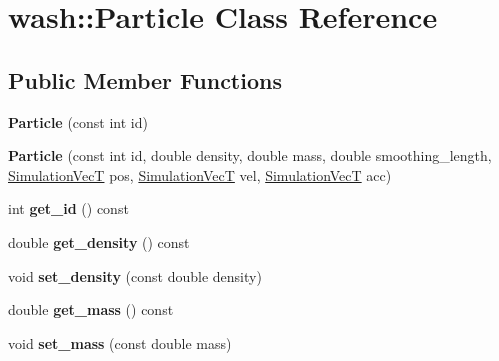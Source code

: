 \hypertarget{classwash_1_1Particle}{}\section{wash\+:\+:Particle Class Reference}
\label{classwash_1_1Particle}
\subsection*{Public Member Functions}
\begin{DoxyCompactItemize}
\item 
\mbox{\label{classwash_1_1Particle_aa7d1ec42cc9e50c64b69b4d1ca60e2bd}} 
{\bfseries Particle} (const int id)
\item 
\mbox{\label{classwash_1_1Particle_ad4372727ee2fd407322e1c3e13f9eae1}} 
{\bfseries Particle} (const int id, double density, double mass, double smoothing\+\_\+length, \mbox{\hyperlink{classwash_1_1Vec}{Simulation\+VecT}} pos, \mbox{\hyperlink{classwash_1_1Vec}{Simulation\+VecT}} vel, \mbox{\hyperlink{classwash_1_1Vec}{Simulation\+VecT}} acc)
\item 
\mbox{\label{classwash_1_1Particle_ad1a609f64405ebeace95a9e7c61f39bb}} 
int {\bfseries get\+\_\+id} () const
\item 
\mbox{\label{classwash_1_1Particle_a8c0ce3f48b189fd8550c3bfab17eec68}} 
double {\bfseries get\+\_\+density} () const
\item 
\mbox{\label{classwash_1_1Particle_a6416678dd509c16c2933d315b6ae6156}} 
void {\bfseries set\+\_\+density} (const double density)
\item 
\mbox{\label{classwash_1_1Particle_a7d8d11b3e4855e66e62ee58b4270cdc1}} 
double {\bfseries get\+\_\+mass} () const
\item 
\mbox{\label{classwash_1_1Particle_a9151ed34c880f63f062381076834223e}} 
void {\bfseries set\+\_\+mass} (const double mass)
\item 
\mbox{\label{classwash_1_1Particle_aab02f56502c6521382cf7a7320abc341}} 

\end{DoxyCompactItemize}
